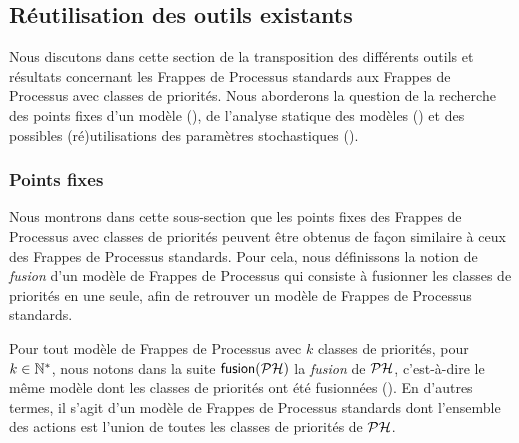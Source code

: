 \subsection{Réutilisation des outils existants}



Nous discutons dans cette section de la transposition des différents outils et
résultats concernant les Frappes de Processus standards
aux Frappes de Processus avec classes de priorités.
Nous aborderons la question de la recherche des points fixes d'un modèle (),
de l'analyse statique des modèles ()
et des possibles (ré)utilisations des paramètres stochastiques ().

\subsubsection{Points fixes}

Nous montrons dans cette sous-section que les points fixes des Frappes de Processus
avec classes de priorités peuvent être obtenus de façon similaire à ceux
des Frappes de Processus standards.
Pour cela, nous définissons la notion de \emph{fusion} d'un modèle de Frappes de Processus
qui consiste à fusionner les classes de priorités en une seule,
afin de retrouver un modèle de Frappes de Processus standards.

\myskip

Pour tout modèle de Frappes de Processus avec $k$ classes de priorités, pour $k \in \mathbb{N}^*$,
nous notons dans la suite $\mathsf{fusion}(\mathcal{PH})$
la \emph{fusion} de $\mathcal{PH}$,
c'est-à-dire le même modèle dont les classes de priorités ont été fusionnées
().
En d'autres termes, il s'agit d'un modèle de Frappes de Processus standards dont
l'ensemble des actions est l'union de toutes les classes de priorités de $\mathcal{PH}$.

